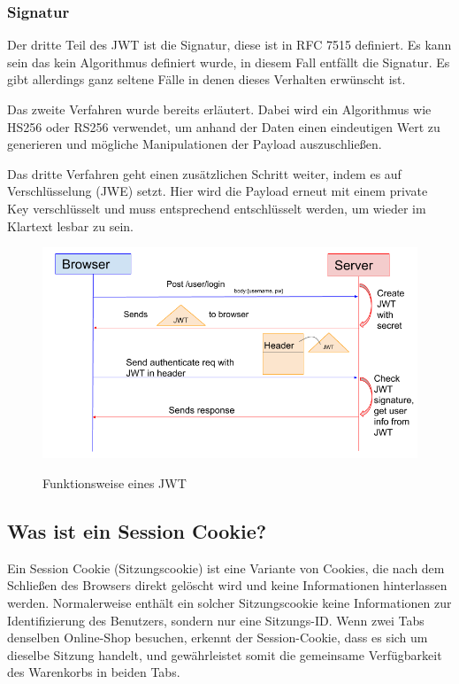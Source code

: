 \subsubsection{Signatur}

Der dritte Teil des JWT ist die Signatur, diese ist in RFC 7515 definiert. Es kann sein das kein Algorithmus definiert wurde, in diesem Fall entfällt die Signatur. Es gibt allerdings ganz seltene Fälle in denen dieses Verhalten erwünscht ist. 



Das zweite Verfahren wurde bereits erläutert. Dabei wird ein Algorithmus wie HS256 oder RS256 verwendet, um anhand der Daten einen eindeutigen Wert zu generieren und mögliche Manipulationen der Payload auszuschließen.



Das dritte Verfahren geht einen zusätzlichen Schritt weiter, indem es auf Verschlüsselung (JWE) setzt. Hier wird die Payload erneut mit einem private Key verschlüsselt und muss entsprechend entschlüsselt werden, um wieder im Klartext lesbar zu sein. \cite{JWT_3}


\begin{figure}[h!]
    \centering
    \includegraphics[width=0.7\linewidth]{pics/jwt-funktion.png}
    \caption{Funktionsweise eines JWT}
    \label{fig:enter-label}
    \cite{jwt_funktion_grafik}
\end{figure}

\subsection{Was ist ein Session Cookie?}


Ein Session Cookie (Sitzungscookie) ist eine Variante von Cookies, die nach dem Schließen des Browsers direkt gelöscht wird und keine Informationen hinterlassen werden. Normalerweise enthält ein solcher Sitzungscookie keine Informationen zur Identifizierung des Benutzers, sondern nur eine Sitzungs-ID.
Wenn zwei Tabs denselben Online-Shop besuchen, erkennt der Session-Cookie, dass es sich um dieselbe Sitzung handelt, und gewährleistet somit die gemeinsame Verfügbarkeit des Warenkorbs in beiden Tabs.

